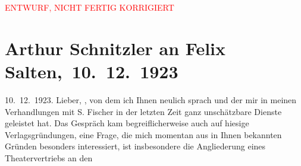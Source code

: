 
\begin{center}
            \textcolor{red}{ENTWURF, NICHT FERTIG KORRIGIERT}
                      \end{center}
            
         
         \renewcommand{\erwaehntePersonen}{Personen: Samuel Fischer, Hans Jacob, Felix Salten, Franz Werfel, Paul Zsolnay}
         \renewcommand{\erwaehnteInstitutionen}{Institutionen: Paul Zsolnay Verlag, S. Fischer Verlag}
         \renewcommand{\erwaehnteOrte}{Orte: Berlin, Paris, Wien, XVIII., Währing}
         \renewcommand{\erwaehnteWerke}{Werke: Verdi}
               \section[ Arthur Schnitzler an Felix Salten, 10. 12. 1923]{ Arthur Schnitzler an Felix Salten, 10. 12. 1923}\nopagebreak{}\rehead{ }\begin{ledgroupsized}[t]{13cm}\normalsize\beginnumbering \toendnotes[C]{\smallbreak\pagebreak[2]} 
\toendnotes[C]{\smallbreak}\pstart
           \raggedleft{}{\pb}10. 12. 1923.\pend
           \pstart{}Lieber,\pend\pstart
           \label{K_L02948-1v}\label{K_L02948-1h}, von dem ich Ihnen neulich sprach und der mir in meinen Verhandlungen mit S. Fischer in der letzten Zeit ganz unschätzbare Dienste geleistet hat. Das Gespräch kam
               begreiflicherweise auch auf hiesige Verlagsgründungen, eine Frage, die mich momentan
               aus in Ihnen bekannten Gründen besonders interessiert, ist insbesondere die
               Angliederung eines Theatervertriebs an den \label{K_L02948-2v}
\end{ledgroupsized}
